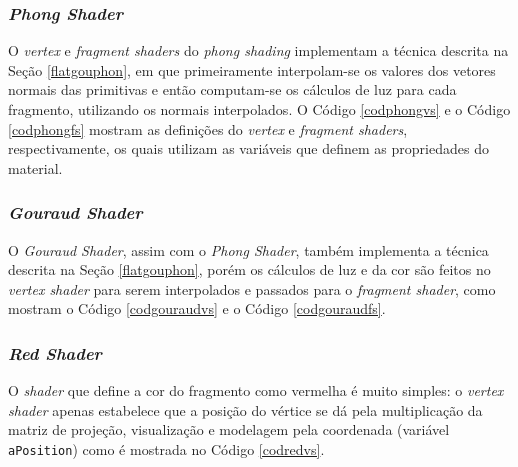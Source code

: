\subsubsection{\textit{Phong Shader}}

	O \textit{vertex} e \textit{fragment shaders} do \textit{phong shading} implementam a técnica descrita na Seção \ref{flatgouphon}, em que primeiramente interpolam-se os valores dos vetores normais das primitivas e então computam-se os cálculos de luz para cada fragmento, utilizando os normais interpolados. O Código \ref{codphongvs} e o Código \ref{codphongfs} mostram as definições do \textit{vertex} e \textit{fragment shaders}, respectivamente, os quais utilizam as variáveis que definem as propriedades do material.  

	

	

\subsubsection{\textit{Gouraud Shader}}

	O \textit{Gouraud Shader}, assim com o \textit{Phong Shader}, também implementa a técnica descrita na Seção \ref{flatgouphon}, porém os cálculos de luz e da cor são feitos no \textit{vertex shader} para serem interpolados e passados para o \textit{fragment shader}, como mostram o Código \ref{codgouraudvs} e o Código \ref{codgouraudfs}. 

	

	
	
\subsubsection{\textit{Red Shader}}
	
	O \textit{shader} que define a cor do fragmento como vermelha é muito simples:  o \textit{vertex shader} apenas estabelece que a posição do vértice  se dá pela multiplicação da matriz de projeção, visualização e modelagem pela coordenada (variável \texttt{aPosition}) como é mostrada no Código \ref{codredvs}. 
	
